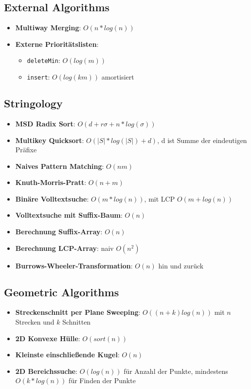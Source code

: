 \documentclass[10pt,a4paper]{article}
\begin{document}
	\subsection{External Algorithms}
	\label{lz:sub:external_algorithms}
	
	\begin{itemize}
		\item \textbf{Multiway Merging}: $O(n * log (n))$
		\item \textbf{Externe Prioritätslisten}:
		\begin{itemize}
			\item \texttt{deleteMin}: $O(log (m))$
			\item \texttt{insert}: $O(log (km))$ amortisiert
		\end{itemize}
	\end{itemize}

	\subsection{Stringology}
	\label{lz:sub:stringology}
	
	\begin{itemize}
		\item \textbf{MSD Radix Sort}: $O(d + r\sigma + n * log (\sigma))$
		\item \textbf{Multikey Quicksort}: $O(|S| * log(|S|) + d)$, d ist Summe der eindeutigen Präfixe
		\item \textbf{Naives Pattern Matching}: $O(nm)$
		\item \textbf{Knuth-Morris-Pratt}: $O(n + m)$
		\item \textbf{Binäre Volltextsuche}: $O(m * log (n))$, mit LCP $O(m + log (n))$
		\item \textbf{Volltextsuche mit Suffix-Baum}: $O(n)$
		\item \textbf{Berechnung Suffix-Array}: $O(n)$
		\item \textbf{Berechnung LCP-Array}: naiv $O(n^2)$
		\item \textbf{Burrows-Wheeler-Transformation}: $O(n)$ hin und zurück
	\end{itemize}

	\subsection{Geometric Algorithms}
	\label{lz:sub:geometric_algorithms}
	
	\begin{itemize}
		\item \textbf{Streckenschnitt per Plane Sweeping}: $O((n + k) log (n))$ mit $n$ Strecken und $k$ Schnitten
		\item \textbf{2D Konvexe Hülle}: $O(sort(n))$
		\item \textbf{Kleinste einschließende Kugel}: $O(n)$
		\item \textbf{2D Bereichssuche}: $O(log (n))$ für Anzahl der Punkte, mindestens $O(k * log (n))$ für Finden der Punkte
	\end{itemize}
\end{document}
